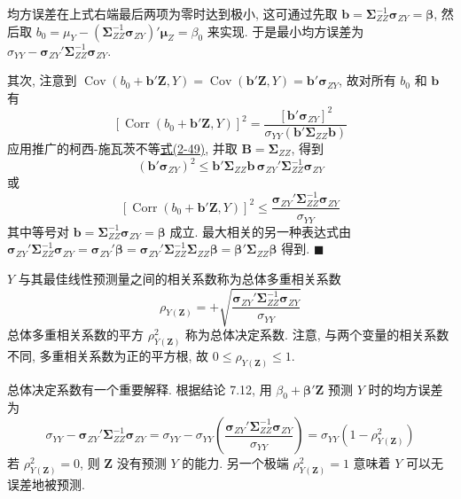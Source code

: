 
均方误差在上式右端最后两项为零时达到极小, 这可通过先取 $\mathbf{b}=\boldsymbol{\Sigma}_{ZZ}^{-1}\boldsymbol{\sigma}_{ZY}=\boldsymbol{\beta}$, 然后取 $b_0=\mu_Y-(\boldsymbol{\Sigma}_{ZZ}^{-1}\boldsymbol{\sigma}_{ZY})'\boldsymbol{\mu}_Z=\beta_0$ 来实现. 于是最小均方误差为 $\sigma_{YY}-\boldsymbol{\sigma}_{ZY}'\boldsymbol{\Sigma}_{ZZ}^{-1}\boldsymbol{\sigma}_{ZY}$.

其次, 注意到 $\operatorname{Cov}(b_0+\mathbf{b}'\mathbf{Z},Y)=\operatorname{Cov}(\mathbf{b}'\mathbf{Z},Y)=\mathbf{b}'\boldsymbol{\sigma}_{ZY}$, 故对所有 $b_0$ 和 $\mathbf{b}$ 有
\[
[\operatorname{Corr}(b_0+\mathbf{b}'\mathbf{Z},Y)]^2
=\frac{[\mathbf{b}'\boldsymbol{\sigma}_{ZY}]^2}{\sigma_{YY}(\mathbf{b}'\boldsymbol{\Sigma}_{ZZ}\mathbf{b})}
\]
应用推广的柯西-施瓦茨不等\hyperref[eq:2-49]{式(2-49)}, 并取 $\mathbf{B}=\boldsymbol{\Sigma}_{ZZ}$, 得到
\[
(\mathbf{b}'\boldsymbol{\sigma}_{ZY})^2\leqslant\mathbf{b}'\boldsymbol{\Sigma}_{ZZ}\mathbf{b}\,\boldsymbol{\sigma}_{ZY}'\boldsymbol{\Sigma}_{ZZ}^{-1}\boldsymbol{\sigma}_{ZY}
\]
或
\[
[\operatorname{Corr}(b_0+\mathbf{b}'\mathbf{Z},Y)]^2
\leqslant\frac{\boldsymbol{\sigma}_{ZY}'\boldsymbol{\Sigma}_{ZZ}^{-1}\boldsymbol{\sigma}_{ZY}}{\sigma_{YY}}
\]
其中等号对 $\mathbf{b}=\boldsymbol{\Sigma}_{ZZ}^{-1}\boldsymbol{\sigma}_{ZY}=\boldsymbol{\beta}$ 成立. 最大相关的另一种表达式由 $\boldsymbol{\sigma}_{ZY}'\boldsymbol{\Sigma}_{ZZ}^{-1}\boldsymbol{\sigma}_{ZY}=\boldsymbol{\sigma}_{ZY}'\boldsymbol{\beta}=\boldsymbol{\sigma}_{ZY}'\boldsymbol{\Sigma}_{ZZ}^{-1}\boldsymbol{\Sigma}_{ZZ}\boldsymbol{\beta}=\boldsymbol{\beta}'\boldsymbol{\Sigma}_{ZZ}\boldsymbol{\beta}$ 得到. \hfill$\blacksquare$

$Y$ 与其最佳线性预测量之间的相关系数称为总体多重相关系数
\label{eq:7-48}
\begin{equation}
\rho_{Y(\mathbf{Z})}=+\sqrt{\frac{\boldsymbol{\sigma}_{ZY}'\boldsymbol{\Sigma}_{ZZ}^{-1}\boldsymbol{\sigma}_{ZY}}{\sigma_{YY}}}
\tag{7-48}
\end{equation}
总体多重相关系数的平方 $\rho_{Y(\mathbf{Z})}^2$ 称为总体决定系数. 注意, 与两个变量的相关系数不同, 多重相关系数为正的平方根, 故 $0\leqslant\rho_{Y(\mathbf{Z})}\leqslant1$.

总体决定系数有一个重要解释. 根据结论 7.12, 用 $\beta_0+\boldsymbol{\beta}'\mathbf{Z}$ 预测 $Y$ 时的均方误差为
\label{eq:7-49}
\begin{equation}
\sigma_{YY}-\boldsymbol{\sigma}_{ZY}'\boldsymbol{\Sigma}_{ZZ}^{-1}\boldsymbol{\sigma}_{ZY}
=\sigma_{YY}-\sigma_{YY}\left(\frac{\boldsymbol{\sigma}_{ZY}'\boldsymbol{\Sigma}_{ZZ}^{-1}\boldsymbol{\sigma}_{ZY}}{\sigma_{YY}}\right)
=\sigma_{YY}(1-\rho_{Y(\mathbf{Z})}^2)
\tag{7-49}
\end{equation}
若 $\rho_{Y(\mathbf{Z})}^2=0$, 则 $\mathbf{Z}$ 没有预测 $Y$ 的能力. 另一个极端 $\rho_{Y(\mathbf{Z})}^2=1$ 意味着 $Y$ 可以无误差地被预测.

